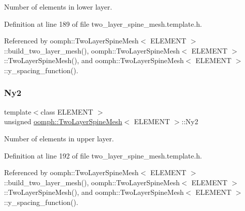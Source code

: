 Number of elements in lower layer. 



Definition at line 189 of file two\+\_\+layer\+\_\+spine\+\_\+mesh.\+template.\+h.



Referenced by oomph\+::\+Two\+Layer\+Spine\+Mesh$<$ E\+L\+E\+M\+E\+N\+T $>$\+::build\+\_\+two\+\_\+layer\+\_\+mesh(), oomph\+::\+Two\+Layer\+Spine\+Mesh$<$ E\+L\+E\+M\+E\+N\+T $>$\+::\+Two\+Layer\+Spine\+Mesh(), and oomph\+::\+Two\+Layer\+Spine\+Mesh$<$ E\+L\+E\+M\+E\+N\+T $>$\+::y\+\_\+spacing\+\_\+function().

\mbox{\label{classoomph_1_1TwoLayerSpineMesh_a48a69edc318571675eed16c9154235e3}} 
\subsubsection{\texorpdfstring{Ny2}{Ny2}}
{\footnotesize\ttfamily template$<$class E\+L\+E\+M\+E\+NT $>$ \\
unsigned \hyperlink{classoomph_1_1TwoLayerSpineMesh}{oomph\+::\+Two\+Layer\+Spine\+Mesh}$<$ E\+L\+E\+M\+E\+NT $>$\+::Ny2\hspace{0.3cm}{\ttfamily [protected]}}



Number of elements in upper layer. 



Definition at line 192 of file two\+\_\+layer\+\_\+spine\+\_\+mesh.\+template.\+h.



Referenced by oomph\+::\+Two\+Layer\+Spine\+Mesh$<$ E\+L\+E\+M\+E\+N\+T $>$\+::build\+\_\+two\+\_\+layer\+\_\+mesh(), oomph\+::\+Two\+Layer\+Spine\+Mesh$<$ E\+L\+E\+M\+E\+N\+T $>$\+::\+Two\+Layer\+Spine\+Mesh(), and oomph\+::\+Two\+Layer\+Spine\+Mesh$<$ E\+L\+E\+M\+E\+N\+T $>$\+::y\+\_\+spacing\+\_\+function().

\mbox{\label{classoomph_1_1TwoLayerSpineMesh_a7ea2169026ec75ecf1d727f022311b65}} 
